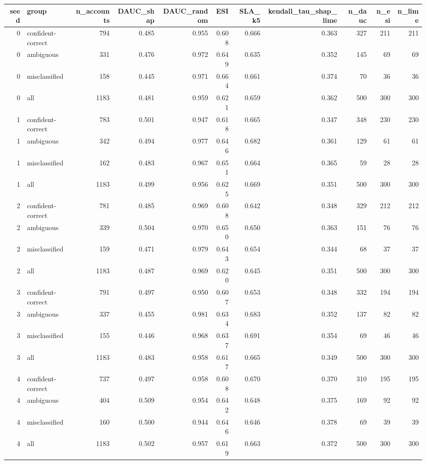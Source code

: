 \begin{tabular}{rlrrrrrrrrr}
\toprule
seed & group & n_accounts & DAUC_shap & DAUC_random & ESI & SLA_k5 & kendall_tau_shap_lime & n_dauc & n_esi & n_lime \\
\midrule
0 & confident-correct & 794 & 0.485 & 0.955 & 0.608 & 0.666 & 0.363 & 327 & 211 & 211 \\
0 & ambiguous & 331 & 0.476 & 0.972 & 0.649 & 0.635 & 0.352 & 145 & 69 & 69 \\
0 & misclassified & 158 & 0.445 & 0.971 & 0.664 & 0.661 & 0.374 & 70 & 36 & 36 \\
0 & all & 1183 & 0.481 & 0.959 & 0.621 & 0.659 & 0.362 & 500 & 300 & 300 \\
1 & confident-correct & 783 & 0.501 & 0.947 & 0.618 & 0.665 & 0.347 & 348 & 230 & 230 \\
1 & ambiguous & 342 & 0.494 & 0.977 & 0.646 & 0.682 & 0.361 & 129 & 61 & 61 \\
1 & misclassified & 162 & 0.483 & 0.967 & 0.651 & 0.664 & 0.365 & 59 & 28 & 28 \\
1 & all & 1183 & 0.499 & 0.956 & 0.625 & 0.669 & 0.351 & 500 & 300 & 300 \\
2 & confident-correct & 781 & 0.485 & 0.969 & 0.608 & 0.642 & 0.348 & 329 & 212 & 212 \\
2 & ambiguous & 339 & 0.504 & 0.970 & 0.650 & 0.650 & 0.363 & 151 & 76 & 76 \\
2 & misclassified & 159 & 0.471 & 0.979 & 0.643 & 0.654 & 0.344 & 68 & 37 & 37 \\
2 & all & 1183 & 0.487 & 0.969 & 0.620 & 0.645 & 0.351 & 500 & 300 & 300 \\
3 & confident-correct & 791 & 0.497 & 0.950 & 0.607 & 0.653 & 0.348 & 332 & 194 & 194 \\
3 & ambiguous & 337 & 0.455 & 0.981 & 0.634 & 0.683 & 0.352 & 137 & 82 & 82 \\
3 & misclassified & 155 & 0.446 & 0.968 & 0.637 & 0.691 & 0.354 & 69 & 46 & 46 \\
3 & all & 1183 & 0.483 & 0.958 & 0.617 & 0.665 & 0.349 & 500 & 300 & 300 \\
4 & confident-correct & 737 & 0.497 & 0.958 & 0.608 & 0.670 & 0.370 & 310 & 195 & 195 \\
4 & ambiguous & 404 & 0.509 & 0.954 & 0.642 & 0.648 & 0.375 & 169 & 92 & 92 \\
4 & misclassified & 160 & 0.500 & 0.944 & 0.646 & 0.646 & 0.378 & 69 & 39 & 39 \\
4 & all & 1183 & 0.502 & 0.957 & 0.619 & 0.663 & 0.372 & 500 & 300 & 300 \\
\bottomrule
\end{tabular}
